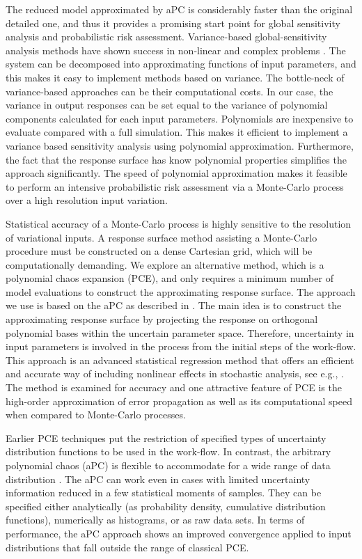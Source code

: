 The reduced model approximated by aPC is considerably faster than the original
detailed one, and thus it  provides a promising start point for global
sensitivity analysis and probabilistic risk assessment. Variance-based global-sensitivity analysis methods have shown success in non-linear and complex problems \cite{reuter2008global}.
The system can be decomposed into approximating functions of input parameters, and this makes it easy to implement methods based on variance. The bottle-neck of variance-based approaches can be their computational costs. In our case, the variance in output responses can be set equal to the variance of polynomial components calculated for each input parameters. Polynomials are inexpensive to evaluate compared with a full simulation. This makes it efficient to implement a variance based sensitivity analysis using polynomial approximation. Furthermore, the fact that the response surface has know polynomial properties simplifies the approach significantly. The speed of polynomial approximation makes it feasible to perform an
intensive probabilistic risk assessment via a Monte-Carlo process over a high resolution input variation.

Statistical accuracy of a Monte-Carlo process is highly sensitive to the
resolution of variational inputs. A response surface method assisting a
Monte-Carlo procedure must be constructed on a dense Cartesian grid, which will
be computationally demanding. We explore an alternative method, which is a polynomial chaos expansion (PCE), and only
requires a minimum number of model evaluations to construct the approximating response surface. The approach we use is based on the aPC as described in \cite{oladyshkin2011concept}. The main idea is to construct the approximating response surface by projecting the response on orthogonal polynomial bases within the uncertain parameter space. Therefore, uncertainty in input parameters is involved in the process from the initial steps of the work-flow. This approach is an advanced statistical regression method that offers an efficient and accurate way of including nonlinear effects in stochastic analysis, see e.g., \cite{Zhang_Lu_2004_JCP,foo_pcm_JCP2010, 
Fajraoui_al_2011_WRR}. The method is examined for accuracy and one attractive
feature of PCE is the high-order approximation of error propagation as well as its computational speed \cite{oladyshkinintegrative} when compared to Monte-Carlo processes.

Earlier PCE techniques put the restriction of specified types of uncertainty
distribution functions to be used in the work-flow. In contrast, the arbitrary polynomial chaos (aPC) is flexible to accommodate for a wide range of data
distribution \cite{oladyshkin2011concept}. The aPC can work even in cases with
limited uncertainty information reduced in a few statistical moments of samples.
They can be specified either analytically (as probability density, cumulative
distribution functions), numerically as histograms, or as raw data sets. In
terms of performance, the aPC approach shows an improved convergence applied to
input distributions that fall outside the range of classical PCE.

